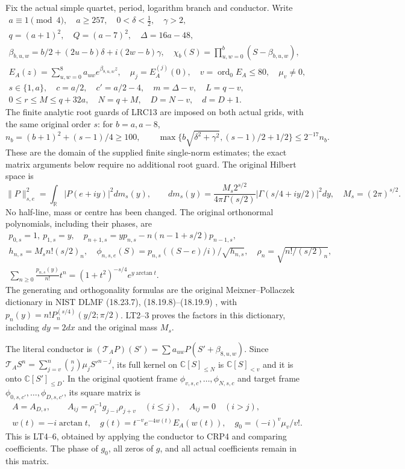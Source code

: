 Fix the actual simple quartet, period, logarithm branch and conductor.
Write
\[
\begin{gathered}
a\equiv1\pmod4,\quad a\ge257,\quad 0<\delta<\tfrac12,\quad\gamma>2,\\
q=(a+1)^2,\quad Q=(a-7)^2,\quad\Delta=16a-48,\\
\beta_{b,u,w}=b/2+(2u-b)\delta+i(2w-b)\gamma,
\quad\chi_b(S)=\prod_{u,w=0}^{b}(S-\beta_{b,u,w}),\\
E_A(z)=\sum_{u,w=0}^{8}a_{uw}e^{\beta_{8,u,w}z},\quad
\mu_j=E_A^{(j)}(0),\quad v=\operatorname{ord}_0 E_A\le80,
\quad\mu_v\ne0,\\
s\in\{1,a\},\quad c=a/2,\quad c'=a/2-4,\quad
m=\Delta-v,\quad L=q-v,\\
0\le r\le M\le q+32a,\quad N=q+M,\quad D=N-v,\quad d=D+1.
\end{gathered}\tag{CRP1}
\]
The finite analytic root guards of LRC13 are imposed on both actual
grids, with the same original order $s$: for $b=a,a-8$,
\[
n_b=(b+1)^2+(s-1)/4\ge100,\qquad
\max\{b\sqrt{\delta^2+\gamma^2},(s-1)/2+1/2\}\le2^{-17}n_b.
\tag{CRP2}
\]
These are the domain of the supplied finite single-norm estimates;
the exact matrix arguments below require no additional root guard.
The original Hilbert space is
\[
\|P\|_{s,e}^2=\int_{\mathbb R}|P(e+iy)|^2dm_s(y),\qquad
dm_s(y)=\frac{M_s2^{s/2}}{4\pi\Gamma(s/2)}
 |\Gamma(s/4+iy/2)|^2dy,\quad M_s=(2\pi)^{s/2}.\tag{CRP3}
\]
No half-line, mass or centre has been changed. The original orthonormal
polynomials, including their phases, are
\[
\begin{gathered}
p_{0,s}=1,\ p_{1,s}=y,\quad
p_{n+1,s}=yp_{n,s}-n(n-1+s/2)p_{n-1,s},\\
h_{n,s}=M_sn!(s/2)_n,\quad
\phi_{n,s,e}(S)=p_{n,s}((S-e)/i)/\sqrt{h_{n,s}},\quad
\rho_n=\sqrt{n!/(s/2)_n},\\
\sum_{n\ge0}\frac{p_{n,s}(y)}{n!}t^n
 =(1+t^2)^{-s/4}e^{y\arctan t}.\tag{CRP4}
\end{gathered}
\]
The generating and orthogonality formulas are the original
Meixner--Pollaczek dictionary in NIST DLMF (18.23.7), (18.19.8)--(18.19.9)
\cite{human:dlmf18}, with $p_n(y)=n!P_n^{(s/4)}(y/2;\pi/2)$.
LT2--3 proves the factors in this dictionary, including $dy=2dx$ and
the original mass $M_s$.

The literal conductor is $(\mathcal T_AP)(S')=
\sum a_{uw}P(S'+\beta_{8,u,w})$. Since
$\mathcal T_AS^n=\sum_{j=v}^n\binom nj\mu_j S'^{n-j}$, its full
kernel on $\mathbb C[S]_{\le N}$ is $\mathbb C[S]_{<v}$ and it is
onto $\mathbb C[S']_{\le D}$. In the original quotient frame
$\phi_{v,s,c},\ldots,\phi_{N,s,c}$ and target frame
$\phi_{0,s,c'},\ldots,\phi_{D,s,c'}$, its square matrix is
\[
\begin{gathered}
A=A_{D,s},\qquad A_{ij}=\rho_i^{-1}g_{j-i}\rho_{j+v}\quad(i\le j),
\quad A_{ij}=0\quad(i>j),\\
w(t)=-i\arctan t,\quad g(t)=t^{-v}e^{-4w(t)}E_A(w(t)),
\quad g_0=(-i)^v\mu_v/v!.\tag{CRP5}
\end{gathered}
\]
This is LT4--6, obtained by applying the conductor to CRP4 and comparing
coefficients. The phase of $g_0$, all zeros of $g$, and all actual
coefficients remain in this matrix.

